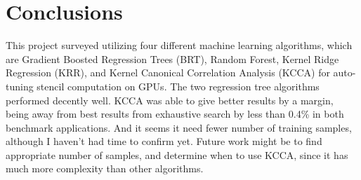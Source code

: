 \section{Conclusions}

This project surveyed utilizing four different machine learning algorithms, which are Gradient Boosted Regression Trees (BRT), Random Forest, Kernel Ridge Regression (KRR), and Kernel Canonical Correlation Analysis (KCCA) for auto-tuning stencil computation on GPUs. The two regression tree algorithms performed decently well. KCCA was able to give better results by a margin, being away from best results from exhaustive search by less than 0.4\% in both benchmark applications. And it seems it need fewer number of training samples, although I haven't had time to confirm yet. Future work might be to find appropriate number of samples, and determine when to use KCCA, since it has much more complexity than other algorithms.
